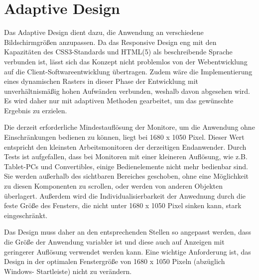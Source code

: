 \chapter{Adaptive Design}
Das Adaptive Design dient dazu, die Anwendung an verschiedene Bildschirmgrößen anzupassen. Da das Responsive Design eng mit den Kapazitäten des CSS3-Standards und HTML(5) als beschreibende Sprache verbunden ist, lässt sich das Konzept nicht problemlos von der Webentwicklung auf die Client-Softwareentwicklung übertragen. Zudem wäre die Implementierung eines dynamischen Rasters in dieser Phase der Entwicklung mit unverhältnismäßig hohen Aufwänden verbunden, weshalb davon abgesehen wird. Es wird daher nur mit adaptiven Methoden gearbeitet, um das gewünschte Ergebnis zu erzielen.\par
Die derzeit erforderliche Mindestauflösung der Monitore, um die Anwendung ohne Einschränkungen bedienen zu können, liegt bei 1680 x 1050 Pixel. Dieser Wert entspricht den kleinsten Arbeitsmonitoren der derzeitigen Endanwender. Durch Tests ist aufgefallen, dass bei Monitoren mit einer kleineren Auflösung, wie z.B. Tablet-PCs und Convertibles, einige Bedienelemente nicht mehr bedienbar sind. Sie werden außerhalb des sichtbaren Bereiches geschoben, ohne eine Möglichkeit zu diesen Komponenten zu scrollen, oder werden von anderen Objekten überlagert. Außerdem wird die Individualisierbarkeit der Anwednung durch die feste Größe des Fensters, die nicht unter 1680 x 1050 Pixel sinken kann, stark eingeschränkt.\par
Das Design muss daher an den entsprechenden Stellen so angepasst werden, dass die Größe der Anwendung variabler ist und diese auch auf Anzeigen mit geringerer Auflösung verwendet werden kann. Eine wichtige Anforderung ist, das Design in der optimalen Fenstergröße von 1680 x 1050 Pixeln (abzüglich Windows- Startleiste) nicht zu verändern.\par
